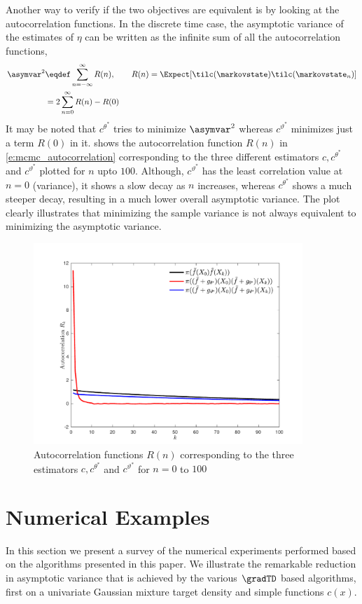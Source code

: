 Another way to verify if the two objectives are equivalent is by looking at the autocorrelation functions. In the discrete time case, the asymptotic variance of the estimates of $\eta$ can be written as the infinite sum of all the autocorrelation functions,
\begin{equation}
\begin{aligned}
\asymvar^2  & \eqdef \sum_{n=-\infty}^\infty R(n), \qquad R(n) = \Expect [\tilc(\markovstate) \tilc(\markovstate_n)] \\
& = 2 \sum_{n=0}^\infty R(n)- R(0)
\end{aligned}
\label{e:mcmc_autocorrelation}
\end{equation}
It may be noted that $c^{\theta^*}$ tries to minimize $\asymvar^2$ whereas $c^{\vartheta^*}$ minimizes just a term $R(0)$ in it.  shows the autocorrelation function $R(n)$ in \eqref{e:mcmc_autocorrelation} corresponding to the three different estimators $c,c^{\theta^*}$  and $c^{\vartheta^*}$ plotted for $n$ upto $100$. Although, $c^{\vartheta^{*}}$ has the least correlation value at $n=0$ (variance), it shows a slow decay as $n$ increases, whereas $c^{\theta^*}$ shows a much steeper decay, resulting in a much lower overall asymptotic variance. The plot clearly illustrates that minimizing the sample variance is not always equivalent to minimizing the asymptotic variance.

\begin{figure}[htbp]
	\centering
	\includegraphics[width=4in]{images/Chap5_cov_R_n_gamma_pt05}
	\caption{ Autocorrelation functions $R(n)$ corresponding to the three estimators $c, c^{\theta^*}$ and $c^{\vartheta^*}$  for $n= 0$ to $100$  }
	\label{fig:mcmc_auto_correlation}
\end{figure}

\section{Numerical Examples}
\label{s:mcmc_numerics}
In this section we present a survey of the numerical experiments performed based on the algorithms presented in this paper. We illustrate the remarkable reduction in asymptotic variance that is achieved by the various $\gradTD$ based algorithms, first on a univariate Gaussian mixture target density and simple functions $c(x)$.   

